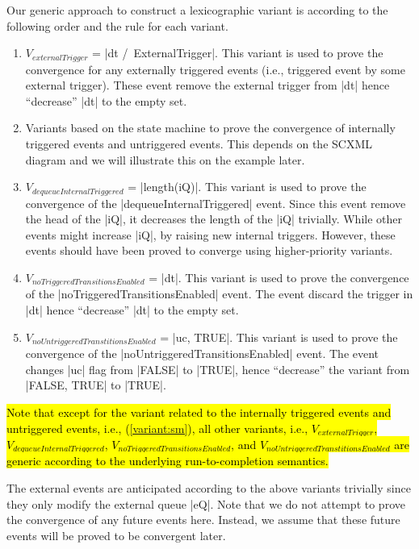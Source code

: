 Our generic approach to construct a lexicographic variant is according
to the following order and the rule for each variant.
\begin{enumerate}
\item $V_{externalTrigger}$ = |dt /\ ExternalTrigger|.  This variant
  is used to prove the convergence for any externally triggered events
  (i.e., triggered event by some external trigger). These event remove
  the external trigger from |dt| hence ``decrease'' |dt| to the empty
  set.

\item \label{variant:sm} Variants based on the state machine to prove
  the convergence of internally triggered events and untriggered
  events.  This depends on the SCXML diagram and we will illustrate
  this on the example later.
  
\item $V_{dequeueInternalTriggered}$ = |length(iQ)|.  This variant is
  used to prove the convergence of the |dequeueInternalTriggered| event.
  Since this event remove the head of the |iQ|, it decreases the
  length of the |iQ| trivially.  While other events might increase
  |iQ|, by raising new internal triggers. However, these events should
  have been proved to converge using higher-priority variants.
  
\item $V_{noTriggeredTransitionsEnabled}$ = |dt|.  This variant is used to
  prove the convergence of the |noTriggeredTransitionsEnabled| event.
  The event discard the trigger in |dt| hence ``decrease'' |dt| to the
  empty set.
  
\item $V_{noUntriggeredTranstitionsEnabled}$ = |{uc, TRUE}|.  This variant is
  used to prove the convergence of the
  |noUntriggeredTransitionsEnabled| event.  The event changes |uc|
  flag from |FALSE| to |TRUE|, hence ``decrease'' the variant from
  |{FALSE, TRUE}| to |{TRUE}|.
\end{enumerate}
\hl{%
  Note that except for the variant related to the internally triggered
  events and untriggered events, i.e., \mbox{(\ref{variant:sm})}, all
  other variants, i.e., $V_{externalTrigger}$,
  $V_{dequeueInternalTriggered}$, $V_{noTriggeredTransitionsEnabled}$,
  and $V_{noUntriggeredTranstitionsEnabled}$ are generic according to
  the underlying run-to-completion semantics.%
}

The external events are anticipated according to the above variants
trivially since they only modify the external queue |eQ|.  Note that
we do not attempt to prove the convergence of any future events
here. Instead, we assume that these future events will be proved to be
convergent later.


